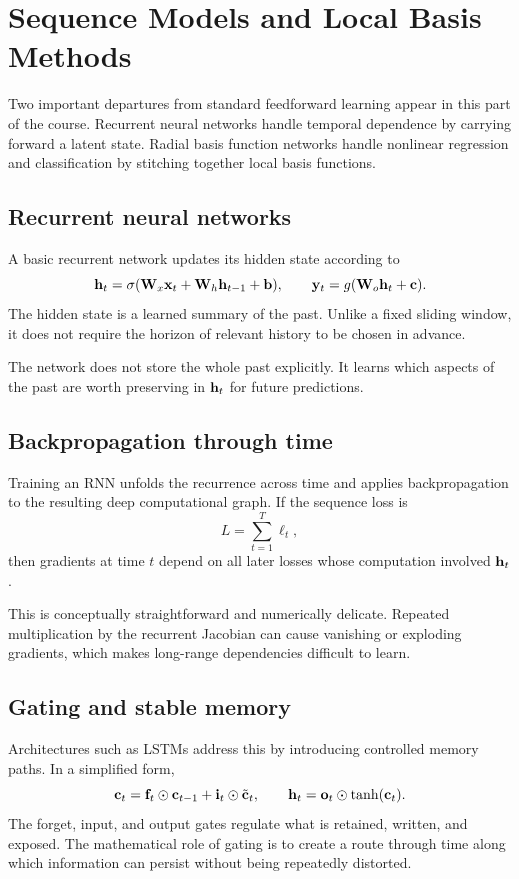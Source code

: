 \chapter{Sequence Models and Local Basis Methods}

Two important departures from standard feedforward learning appear in this part of the course. Recurrent neural networks handle temporal dependence by carrying forward a latent state. Radial basis function networks handle nonlinear regression and classification by stitching together local basis functions.

\section{Recurrent neural networks}

A basic recurrent network updates its hidden state according to
\[
  \mathbf{h}_t = \sigma(\mathbf{W}_x \mathbf{x}_t + \mathbf{W}_h \mathbf{h}_{t-1} + \mathbf{b}),
  \qquad
  \mathbf{y}_t = g(\mathbf{W}_o \mathbf{h}_t + \mathbf{c}).
\]
The hidden state is a learned summary of the past. Unlike a fixed sliding window, it does not require the horizon of relevant history to be chosen in advance.

\begin{aside}
The network does not store the whole past explicitly. It learns which aspects of the past are worth preserving in $\mathbf{h}_t$ for future predictions.
\end{aside}

\section{Backpropagation through time}

Training an RNN unfolds the recurrence across time and applies backpropagation to the resulting deep computational graph. If the sequence loss is
\[
  L = \sum_{t=1}^{T} \ell_t,
\]
then gradients at time $t$ depend on all later losses whose computation involved $\mathbf{h}_t$.

This is conceptually straightforward and numerically delicate. Repeated multiplication by the recurrent Jacobian can cause vanishing or exploding gradients, which makes long-range dependencies difficult to learn.

\section{Gating and stable memory}

Architectures such as LSTMs address this by introducing controlled memory paths. In a simplified form,
\[
  \mathbf{c}_t = \mathbf{f}_t \odot \mathbf{c}_{t-1} + \mathbf{i}_t \odot \tilde{\mathbf{c}}_t,
  \qquad
  \mathbf{h}_t = \mathbf{o}_t \odot \tanh(\mathbf{c}_t).
\]
The forget, input, and output gates regulate what is retained, written, and exposed. The mathematical role of gating is to create a route through time along which information can persist without being repeatedly distorted.

